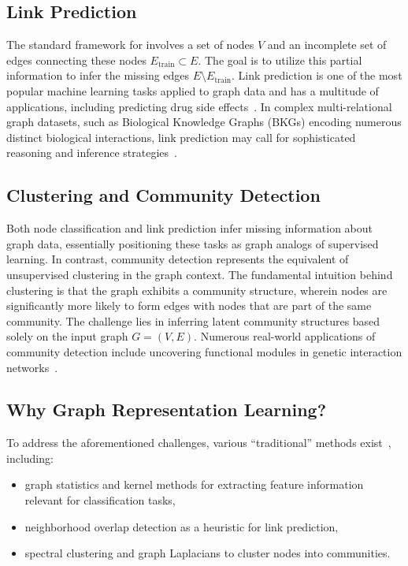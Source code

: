 \subsection{Link Prediction}
The standard framework for  involves a set of nodes $ V $ and an incomplete set of edges connecting these nodes $ E_\text{train} \subset E $. The goal is to utilize this partial information to infer the missing edges $ E \setminus E_\text{train} $. Link prediction is one of the most popular machine learning tasks applied to graph data and has a multitude of applications, including predicting drug side effects~\cite{Zitnik2018ModelingPolypharmacySideEffectsGCN}. In complex multi-relational graph datasets, such as Biological Knowledge Graphs (BKGs) encoding numerous distinct biological interactions, link prediction may call for sophisticated reasoning and inference strategies~\cite{Nickel2015ReviewRelationalMLKG}.

\subsection{Clustering and Community Detection}
Both node classification and link prediction infer missing information about graph data, essentially positioning these tasks as graph analogs of supervised learning. In contrast, community detection represents the equivalent of unsupervised clustering in the graph context. The fundamental intuition behind clustering is that the graph exhibits a community structure, wherein nodes are significantly more likely to form edges with nodes that are part of the same community. The challenge lies in inferring latent community structures based solely on the input graph $ G = (V, E) $. Numerous real-world applications of community detection include uncovering functional modules in genetic interaction networks~\cite{Agrawal2018LargeScaleAnalysisDiseasePathwaysHumanInteractome}.

\subsection{Why Graph Representation Learning?}
To address the aforementioned challenges, various ``traditional'' methods exist~\cite{Hamilton2020GraphRL}, including:
\begin{itemize}
    \item graph statistics and kernel methods for extracting feature information relevant for classification tasks,
    \item neighborhood overlap detection as a heuristic for link prediction,
    \item spectral clustering and graph Laplacians to cluster nodes into communities.
\end{itemize}

